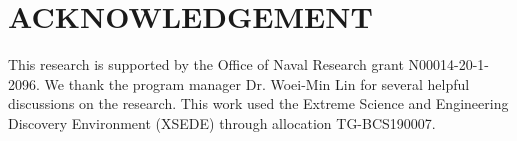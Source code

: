\documentclass[11pt]{article}
\begin{document}
\section*{ACKNOWLEDGEMENT}

This research is supported by the Office of Naval Research
grant N00014-20-1-2096. We thank the program manager Dr. Woei-Min Lin for several helpful discussions
on the research. 
This work used the Extreme Science and Engineering Discovery Environment (XSEDE) through allocation TG-BCS190007. 





\appendix
\end{document}
